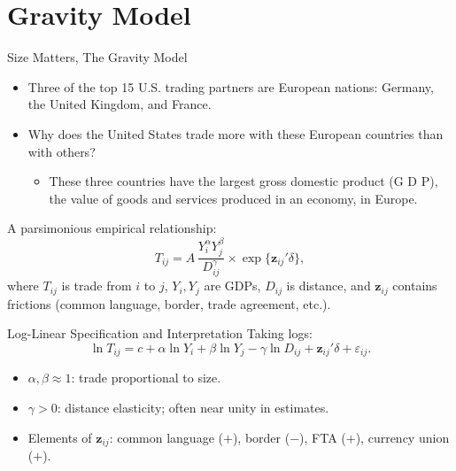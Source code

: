 \documentclass{beamer}
\begin{document}
\section{Gravity Model}
\begin{frame}{Size Matters,  The Gravity Model}
\begin{itemize}
\item Three of the top 15 U.S. trading partners are European nations: Germany, the United Kingdom, and France.
\item Why does the United States trade more with these European countries than with others?
\begin{itemize}
\item These three countries have the largest gross domestic product (G D P), the value of goods and services produced in an economy, in Europe.
\end{itemize}
\end{itemize}




A parsimonious empirical relationship:
\begin{equation*}
T_{ij} = A\, \frac{Y_i^{\alpha} Y_j^{\beta}}{D_{ij}^{\gamma}} \times \exp\{\bm{z}_{ij}'\delta\},
\end{equation*}
where $T_{ij}$ is trade from $i$ to $j$, $Y_i, Y_j$ are GDPs, $D_{ij}$ is distance, and $\bm{z}_{ij}$ contains frictions (common language, border, trade agreement, etc.).
\end{frame}

\begin{frame}{Log-Linear Specification and Interpretation}
Taking logs:
\begin{equation*}
\ln T_{ij} = c + \alpha \ln Y_i + \beta \ln Y_j - \gamma \ln D_{ij} + \bm{z}_{ij}'\delta + \varepsilon_{ij}.
\end{equation*}
\begin{itemize}
  \item $\alpha,\beta \approx 1$: trade proportional to size.
  \item $\gamma > 0$: distance elasticity; often near unity in estimates.
  \item Elements of $\bm{z}_{ij}$: common language ($+$), border ($-$), FTA ($+$), currency union ($+$).
\end{itemize}
\end{frame}
\end{document}
